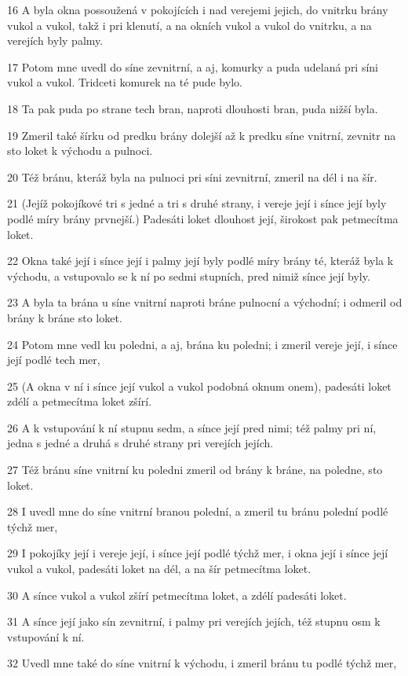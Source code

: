 \par 16 A byla okna possoužená v pokojících i nad verejemi jejich, do vnitrku brány vukol a vukol, takž i pri klenutí, a na okních vukol a vukol do vnitrku, a na verejích byly palmy.
\par 17 Potom mne uvedl do síne zevnitrní, a aj, komurky a puda udelaná pri síni vukol a vukol. Tridceti komurek na té pude bylo.
\par 18 Ta pak puda po strane tech bran, naproti dlouhosti bran, puda nižší byla.
\par 19 Zmeril také šírku od predku brány dolejší až k predku síne vnitrní, zevnitr na sto loket k východu a pulnoci.
\par 20 Též bránu, kteráž byla na pulnoci pri síni zevnitrní, zmeril na dél i na šír.
\par 21 (Jejíž pokojíkové tri s jedné a tri s druhé strany, i vereje její i sínce její byly podlé míry brány prvnejší.) Padesáti loket dlouhost její, širokost pak petmecítma loket.
\par 22 Okna také její i sínce její i palmy její byly podlé míry brány té, kteráž byla k východu, a vstupovalo se k ní po sedmi stupních, pred nimiž sínce její byly.
\par 23 A byla ta brána u síne vnitrní naproti bráne pulnocní a východní; i odmeril od brány k bráne sto loket.
\par 24 Potom mne vedl ku poledni, a aj, brána ku poledni; i zmeril vereje její, i sínce její podlé tech mer,
\par 25 (A okna v ní i sínce její vukol a vukol podobná oknum onem), padesáti loket zdélí a petmecítma loket zšírí.
\par 26 A k vstupování k ní stupnu sedm, a sínce její pred nimi; též palmy pri ní, jedna s jedné a druhá s druhé strany pri verejích jejích.
\par 27 Též bránu síne vnitrní ku poledni zmeril od brány k bráne, na poledne, sto loket.
\par 28 I uvedl mne do síne vnitrní branou polední, a zmeril tu bránu polední podlé týchž mer,
\par 29 I pokojíky její i vereje její, i sínce její podlé týchž mer, i okna její i sínce její vukol a vukol, padesáti loket na dél, a na šír petmecítma loket.
\par 30 A sínce vukol a vukol zšírí petmecítma loket, a zdélí padesáti loket.
\par 31 A sínce její jako sín zevnitrní, i palmy pri verejích jejích, též stupnu osm k vstupování k ní.
\par 32 Uvedl mne také do síne vnitrní k východu, i zmeril bránu tu podlé týchž mer,
